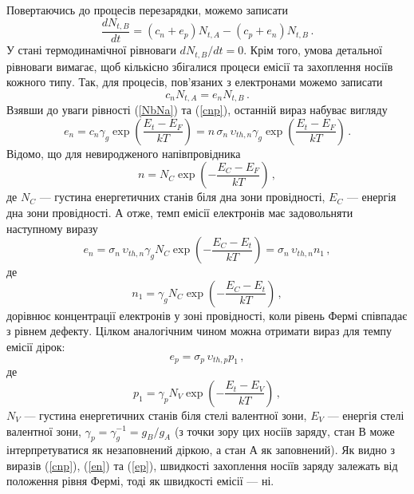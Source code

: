 Повертаючись до процесів перезарядки, можемо записати
\begin{equation}
\label{dNdt}
 \frac{dN_{t,B}}{dt}=\left(c_n+e_p\right)N_{t,A}-\left(c_p+e_n\right)N_{t,B}\,.
\end{equation}
У стані термодинамічної рівноваги $dN_{t,B}/dt=0$.
Крім того, умова детальної рівноваги вимагає, щоб кількісно збігалися
процеси емісії та захоплення носіїв кожного типу.
Так, для процесів, пов'язаних з електронами можемо записати
\begin{equation}
\label{rivn}
 c_nN_{t,A}=e_nN_{t,B}\,.
\end{equation}
Взявши до уваги рівності (\ref{NbNa}) та (\ref{cnp}), останній вираз набуває вигляду
\begin{equation}
\label{ecn}
e_n=c_n\gamma_g\exp\left(\frac{E_t-E_F}{kT}\right)=n\,\sigma_n\,\upsilon_{th,n}\gamma_g\exp\left(\frac{E_t-E_F}{kT}\right)\,.
\end{equation}
Відомо, що для невиродженого напівпровідника
\begin{equation}
\label{n}
n=N_C\exp\left(-\frac{E_C-E_F}{kT}\right)\,,
\end{equation}
де
$N_C$ --- густина енергетичних станів біля дна зони провідності,
$E_C$ --- енергія дна зони провідності.
А отже, темп емісії електронів має задовольняти наступному виразу
\begin{equation}
\label{en}
e_n=\sigma_n\,\upsilon_{th,n}\gamma_g N_C \exp\left(-\frac{E_C-E_t}{kT}\right)=\sigma_n\,\upsilon_{th,n}n_1\,,
\end{equation}
де
\begin{equation}
\label{n1}
n_1=\gamma_g N_C \exp\left(-\frac{E_C-E_t}{kT}\right)\,,
\end{equation}
дорівнює концентрації електронів у зоні провідності, коли рівень Фермі
співпадає з рівнем дефекту.
Цілком аналогічним чином можна отримати вираз для темпу емісії дірок:
\begin{equation}
\label{ep}
e_p=\sigma_p\,\upsilon_{th,p}p_1\,,
\end{equation}
де
\begin{equation}
\label{p1}
p_1=\gamma_p N_V \exp\left(-\frac{E_t-E_V}{kT}\right)\,,
\end{equation}
$N_V$ --- густина енергетичних станів біля стелі валентної зони,
$E_V$ --- енергія стелі валентної зони,
$\gamma_p=\gamma_g^{-1}=g_{B}/g_{A}$ (з точки зору цих носіїв заряду, стан В може інтерпретуватися як незаповнений діркою,
а стан А як заповнений).
Як видно з виразів (\ref{cnp}), (\ref{en}) та  (\ref{ep}),
швидкості захоплення носіїв заряду залежать від положення рівня Фермі,
тоді як швидкості емісії --- ні.

